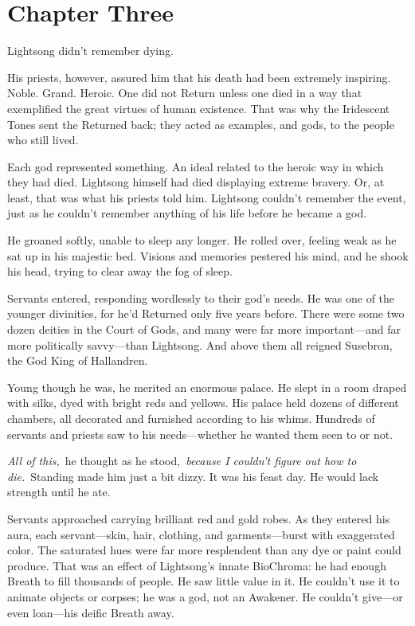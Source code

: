\section{Chapter Three}

Lightsong didn’t remember dying.

His priests, however, assured him that his death had been extremely inspiring. Noble. Grand. Heroic. One did not Return unless one died in a way that exemplified the great virtues of human existence. That was why the Iridescent Tones sent the Returned back; they acted as examples, and gods, to the people who still lived.

Each god represented something. An ideal related to the heroic way in which they had died. Lightsong himself had died displaying extreme bravery. Or, at least, that was what his priests told him. Lightsong couldn’t remember the event, just as he couldn’t remember anything of his life before he became a god.

He groaned softly, unable to sleep any longer. He rolled over, feeling weak as he sat up in his majestic bed. Visions and memories pestered his mind, and he shook his head, trying to clear away the fog of sleep.

Servants entered, responding wordlessly to their god’s needs. He was one of the younger divinities, for he’d Returned only five years before. There were some two dozen deities in the Court of Gods, and many were far more important—and far more politically savvy—than Lightsong. And above them all reigned Susebron, the God King of Hallandren.

Young though he was, he merited an enormous palace. He slept in a room draped with silks, dyed with bright reds and yellows. His palace held dozens of different chambers, all decorated and furnished according to his whims. Hundreds of servants and priests saw to his needs—whether he wanted them seen to or not.

\textit{All of this,}~he thought as he stood,~\textit{because I couldn’t figure out how to die.}~Standing made him just a bit dizzy. It was his feast day. He would lack strength until he ate.

Servants approached carrying brilliant red and gold robes. As they entered his aura, each servant—skin, hair, clothing, and garments—burst with exaggerated color. The saturated hues were far more resplendent than any dye or paint could produce. That was an effect of Lightsong’s innate BioChroma: he had enough Breath to fill thousands of people. He saw little value in it. He couldn’t use it to animate objects or corpses; he was a god, not an Awakener. He couldn’t give—or even loan—his deific Breath away.

